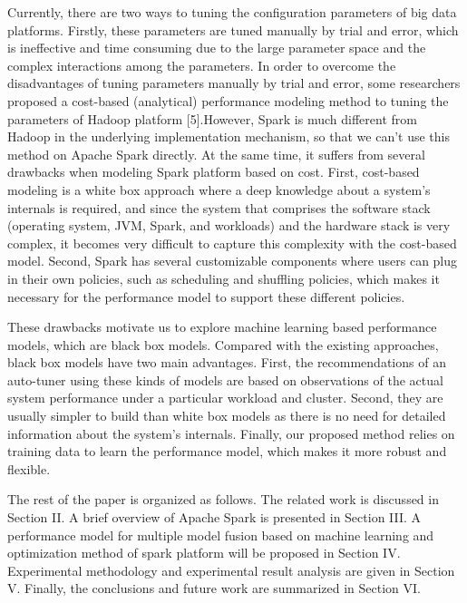 \par Currently, there are two ways to tuning the configuration parameters of big data platforms. Firstly, these parameters are tuned manually by trial and error, which is ineffective and time consuming due to the large parameter space and the complex interactions among the parameters. In order to overcome the disadvantages of tuning parameters manually by trial and error, some researchers proposed a cost-based
(analytical) performance modeling method to tuning the parameters of Hadoop platform [5].However, Spark is much different from Hadoop in the underlying implementation mechanism, so that we can’t use this method on Apache Spark directly. At the same time, it suffers from several drawbacks when modeling Spark platform based on cost. First, cost-based modeling is a white box approach where a deep knowledge
about a system’s internals is required, and since the system that comprises the software stack (operating system, JVM, Spark, and workloads) and the hardware stack is very complex, it becomes very difficult to capture this complexity with the cost-based model. Second, Spark has several customizable components where users can plug in their own policies, such as scheduling and shuffling policies, which makes it necessary for the performance model to support these different policies.

\par These drawbacks motivate us to explore machine learning based performance models, which are black box models. Compared with the existing approaches, black box models have two main advantages. First, the recommendations of an auto-tuner using these kinds of models are based on observations of the actual system performance under a particular workload and cluster. Second, they are usually simpler to build than white box models as there is no need for detailed information about the system’s internals. Finally, our
proposed method relies on training data to learn the performance model, which makes it more robust and flexible.

\par The rest of the paper is organized as follows. The related work is discussed in Section II. A brief overview of Apache Spark is presented in Section III. A performance model for multiple model fusion based on machine learning and optimization method of spark platform will be proposed in Section IV. Experimental methodology and experimental result analysis are given in Section V. Finally, the conclusions and future work are summarized in Section VI. \cite{wang2011openflow}
